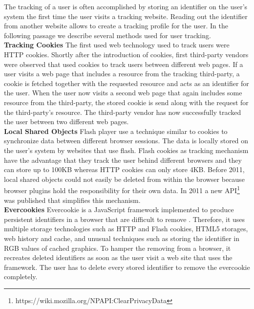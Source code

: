 \documentclass[article,colorback,accentcolor=tud9c,type=bsc]{tudthesis}
\begin{document}
	The tracking of a user is often accomplished by storing an identifier on the user's system the first time the user visits a tracking website. Reading out the identifier from another website allows to create a tracking profile for the user. In the following passage we describe several methods used for user tracking. \\
	
	\textbf{Tracking Cookies} The first used web technology used to track users were HTTP cookies. Shortly after the introduction of cookies, first third-party vendors were observed that used cookies to track users between different web pages. If a user visits a web page that includes a resource from the tracking third-party, a cookie is fetched together with the requested resource and acts as an identifier for the user. When the user now visits a second web page that again includes some resource from the third-party, the stored cookie is send along with the request for the third-party's resource. The third-party vendor has now successfully tracked the user between two different web pages.  \\
	
	\textbf{Local Shared Objects} Flash player use a technique similar to cookies to synchronize data between different browser sessions. The data is locally stored on the user's system by websites that use flash. Flash cookies as tracking mechanism have the advantage that they track the user behind different browsers and they can store up to 100KB whereas HTTP cookies can only store 4KB. Before 2011, local shared objects could not easily be deleted from within the browser because browser plugins hold the responsibility for their own data. In 2011 a new API\footnote{https://wiki.mozilla.org/NPAPI:ClearPrivacyData} was published that simplifies this mechanism. \\ 
	
	\textbf{Evercookies} Evercookie is a JavaScript framework implemented to produce persistent identifiers in a browser that are difficult to remove \cite{evercookie}. Therefore, it uses multiple storage technologies such as HTTP and Flash cookies, HTML5 storages, web history and cache, and unusual techniques such as storing the identifier in RGB values of cached graphics. To hamper the removing from a browser, it recreates deleted identifiers as soon as the user visit a web site that uses the framework. The user has to delete every stored identifier to remove the evercookie completely. \\
	
\end{document}
